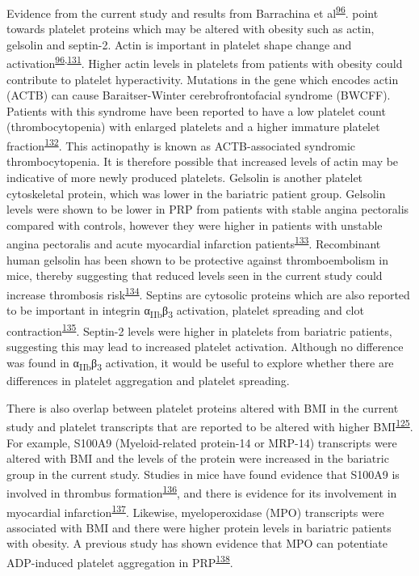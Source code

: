 \documentclass[11pt,twoside]{bristolthesis}
\begin{document}
Evidence from the current study and results from Barrachina et al\textsuperscript{\protect\hyperlink{ref-Barrachina2019}{96}}. point towards platelet proteins which may be altered with obesity such as actin, gelsolin and septin-2. Actin is important in platelet shape change and activation\textsuperscript{\protect\hyperlink{ref-Barrachina2019}{96},\protect\hyperlink{ref-Bearer2002}{131}}. Higher actin levels in platelets from patients with obesity could contribute to platelet hyperactivity. Mutations in the gene which encodes actin (ACTB) can cause Baraitser-Winter cerebrofrontofacial syndrome (BWCFF). Patients with this syndrome have been reported to have a low platelet count (thrombocytopenia) with enlarged platelets and a higher immature platelet fraction\textsuperscript{\protect\hyperlink{ref-Latham2018}{132}}. This actinopathy is known as ACTB-associated syndromic thrombocytopenia. It is therefore possible that increased levels of actin may be indicative of more newly produced platelets. Gelsolin is another platelet cytoskeletal protein, which was lower in the bariatric patient group. Gelsolin levels were shown to be lower in PRP from patients with stable angina pectoralis compared with controls, however they were higher in patients with unstable angina pectoralis and acute myocardial infarction patients\textsuperscript{\protect\hyperlink{ref-Yue2011}{133}}. Recombinant human gelsolin has been shown to be protective against thromboembolism in mice, thereby suggesting that reduced levels seen in the current study could increase thrombosis risk\textsuperscript{\protect\hyperlink{ref-Gupta2019}{134}}. Septins are cytosolic proteins which are also reported to be important in integrin α\textsubscript{IIb}β\textsubscript{3} activation, platelet spreading and clot contraction\textsuperscript{\protect\hyperlink{ref-Kim2020}{135}}. Septin-2 levels were higher in platelets from bariatric patients, suggesting this may lead to increased platelet activation. Although no difference was found in α\textsubscript{IIb}β\textsubscript{3} activation, it would be useful to explore whether there are differences in platelet aggregation and platelet spreading.

There is also overlap between platelet proteins altered with BMI in the current study and platelet transcripts that are reported to be altered with higher BMI\textsuperscript{\protect\hyperlink{ref-Freedman2010}{125}}. For example, S100A9 (Myeloid-related protein-14 or MRP-14) transcripts were altered with BMI and the levels of the protein were increased in the bariatric group in the current study. Studies in mice have found evidence that S100A9 is involved in thrombus formation\textsuperscript{\protect\hyperlink{ref-Wang2014a}{136}}, and there is evidence for its involvement in myocardial infarction\textsuperscript{\protect\hyperlink{ref-Cai2020}{137}}. Likewise, myeloperoxidase (MPO) transcripts were associated with BMI and there were higher protein levels in bariatric patients with obesity. A previous study has shown evidence that MPO can potentiate ADP-induced platelet aggregation in PRP\textsuperscript{\protect\hyperlink{ref-Gorudko2013}{138}}.
\end{document}
